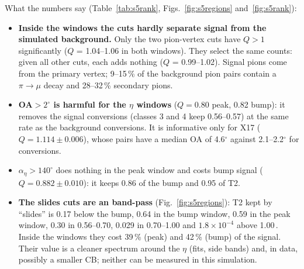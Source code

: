 What the numbers say (Table~\ref{tab:s5rank}, Figs.~\ref{fig:s5regions} and~\ref{fig:s5rank}):
\begin{itemize}
\item \textbf{Inside the windows the cuts hardly separate signal from the simulated background.}
      Only the two pion-vertex cuts have $Q>1$ significantly ($Q$ = 1.04--1.06 in both windows).
      They select the same counts: given all other cuts, each adds nothing ($Q$ = 0.99--1.02).
      Signal pions come from the primary vertex; 9--15\,\% of the background pion pairs contain a
      $\pi\to\mu$ decay and 28--32\,\% secondary pions.
\item \textbf{OA$>2^\circ$ is harmful for the $\eta$ windows} ($Q = 0.80$ peak, 0.82 bump): it
      removes the signal conversions (classes 3 and 4 keep 0.56--0.57) at the same rate as the
      background conversions. It is informative only for X17 ($Q = 1.114\pm0.006$), whose pairs have a
      median OA of 4.6$^\circ$ against 2.1--2.2$^\circ$ for conversions.
\item \textbf{$\alpha_\eta>140^\circ$} does nothing in the peak window and costs bump signal
      ($Q = 0.882\pm0.010$): it keeps 0.86 of the bump and 0.95 of T2.
\item \textbf{The slides cuts are an \Mfour band-pass} (Fig.~\ref{fig:s5regions}): T2 kept by
      ``slides'' is 0.17 below the bump, 0.64 in the bump window, 0.59 in the peak window, 0.30 in
      0.56--0.70, 0.029 in 0.70--1.00 and $1.8\times10^{-4}$ above 1.00\,\GeVcc. Inside the windows
      they cost 39\,\% (peak) and 42\,\% (bump) of the signal. Their value is a cleaner spectrum
      around the $\eta$ (fits, side bands) and, in data, possibly a smaller CB; neither can be measured
      in this simulation.
\end{itemize}

